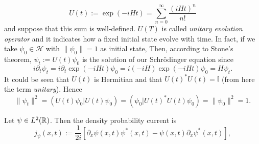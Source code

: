  \begin{equation}
 	U(t):=\exp(-iHt)=\sum_{n=0}^{\infty}\frac{(iHt)^n}{n!}
 \end{equation}
 and suppose that this sum is well-defined. $U(T)$ is called \textit{unitary evolution operator} and it indicates how a fixed initial state evolve with time. In fact, if we take $\psi_0\in\mathcal{H}$ with $\|\psi_0\|=1$ as initial state, Then, according to Stone's theorem, $\psi_t:=U(t)\psi_0$ is the solution of our Schr\"{o}dinger equation since
 \begin{equation}
 	i\partial_t\psi_t=i\partial_t\exp(-iHt)\psi_0=i(-iH)\exp(-iHt)\psi_0=H\psi_t.
 \end{equation}
 It could be seen that $U(t)$ is Hermitian and that $U(t)^*U(t)=\mathbb{I}$ (from here the term \textit{unitary}). Hence
 \begin{equation}
 	\|\psi_t\|^2=(U(t)\psi_0|U(t)\psi_0)=(\psi_0|U(t)^*U(t)\psi_0)=\|\psi_0\|^2=1.
 \end{equation}
 \begin{definition}
 	\label{def:density_current}
 	Let $\psi\in L^2({\mathbb R})$. Then the density probability current is
 	\begin{equation}
 	j_\psi(x,t):=\frac{1}{2i}[\partial_x\psi(x,t)\psi^*(x,t)-\psi(x,t)\partial_x\psi^*(x,t)],
 	\label{eq:density_current}
 	\end{equation}
 \end{definition}
